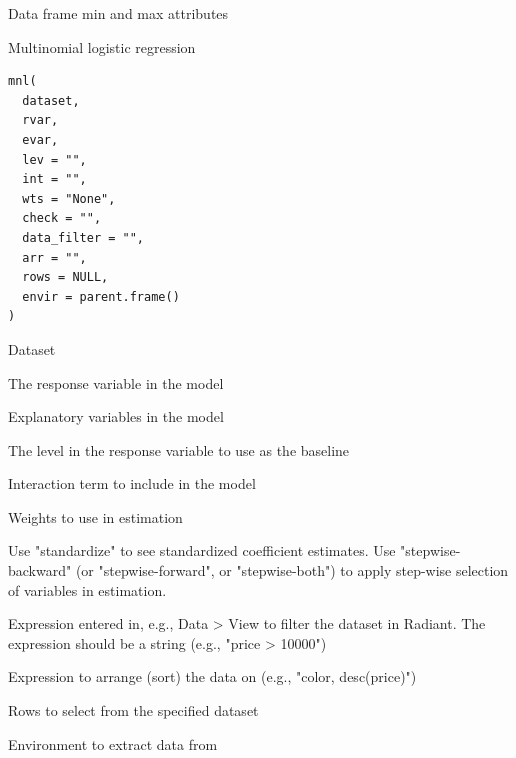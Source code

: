 \documentclass[a4paper]{book}
\begin{document}
%
\begin{Value}
Data frame min and max attributes
\end{Value}
%
\begin{Description}
Multinomial logistic regression
\end{Description}
%
\begin{Usage}
\begin{verbatim}
mnl(
  dataset,
  rvar,
  evar,
  lev = "",
  int = "",
  wts = "None",
  check = "",
  data_filter = "",
  arr = "",
  rows = NULL,
  envir = parent.frame()
)
\end{verbatim}
\end{Usage}
%
\begin{Arguments}
\begin{ldescription}
\item[\code{dataset}] Dataset

\item[\code{rvar}] The response variable in the model

\item[\code{evar}] Explanatory variables in the model

\item[\code{lev}] The level in the response variable to use as the baseline

\item[\code{int}] Interaction term to include in the model

\item[\code{wts}] Weights to use in estimation

\item[\code{check}] Use "standardize" to see standardized coefficient estimates. Use "stepwise-backward" (or "stepwise-forward", or "stepwise-both") to apply step-wise selection of variables in estimation.

\item[\code{data\_filter}] Expression entered in, e.g., Data > View to filter the dataset in Radiant. The expression should be a string (e.g., "price > 10000")

\item[\code{arr}] Expression to arrange (sort) the data on (e.g., "color, desc(price)")

\item[\code{rows}] Rows to select from the specified dataset

\item[\code{envir}] Environment to extract data from
\end{ldescription}
\end{Arguments}
\end{document}
